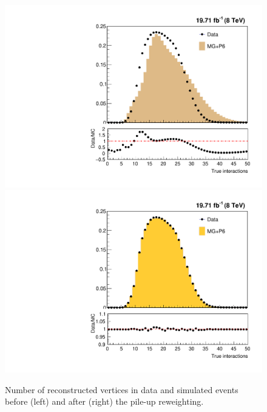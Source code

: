\begin{figure}[!htbp]
  \begin{center}
    \includegraphics[scale = 0.4]{Plots_HT_2_150/Nvertices.pdf}%
    \includegraphics[scale = 0.4]{Plots_HT_2_150/Nvertices_weight.pdf}
    \caption{Number of reconstructed vertices in data and simulated events before (left) and after (right) the pile-up reweighting.}
    \label{fig:pileup}
  \end{center}
\end{figure}

